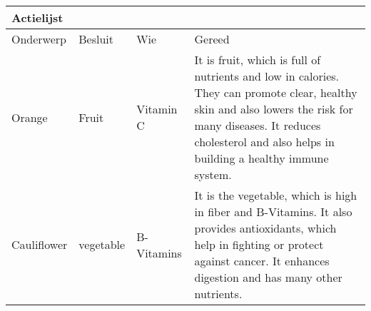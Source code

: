 \newpage
 



 
 


\begin{center}  
	\begin{tabular}{ | l | l | l | p{5cm} |} %
		\hline  
		\multicolumn{4}{|l|}{Actielijst} \\ \hline  
		Onderwerp & Besluit & Wie &Gereed \\ \hline  
		Orange & Fruit & Vitamin C & It is fruit, which is full of nutrients and low in calories. They can promote clear, healthy skin and also lowers the risk for many diseases. It reduces cholesterol and also helps in building a healthy immune system.\\ \hline  
		
		Cauliflower & vegetable & B-Vitamins & It is the vegetable, which is high in fiber and B-Vitamins. It also provides antioxidants, which help in fighting or protect against cancer. It enhances digestion and has many other nutrients.\\ \hline  
		
	\end{tabular}  
\end{center}  


